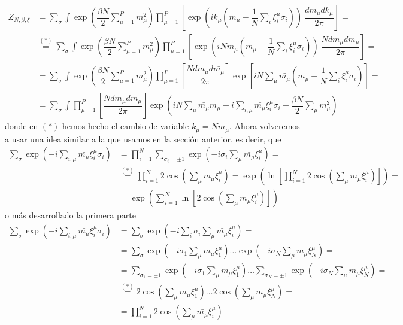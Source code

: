 \begin{align*}
    Z_{N,\beta,\xi}&=\sum_{\sigma}\int \exp\left(\dfrac{\beta N}{2} \sum_{\mu=1}^P m_\mu^2\right) \prod_{\mu=1}^{P} \left[\exp\left(ik_{\mu}\left(m_{\mu}-\dfrac{1}{N}\sum_{i} \xi_i^{\mu} \sigma_i\right)\right) \ \dfrac{dm_{\mu}dk_{\mu}}{2\pi}\right]=\\
    &\overset{(*)}{=}\sum_{\sigma}\int \exp\left(\dfrac{\beta N}{2} \sum_{\mu=1}^P m_\mu^2\right) \prod_{\mu=1}^{P} \left[\exp\left(iN\bar{m_{\mu}}\left(m_{\mu}-\dfrac{1}{N}\sum_{i} \xi_i^{\mu} \sigma_i\right)\right) \ \dfrac{Ndm_{\mu}d\bar{m_{\mu}}}{2\pi}\right]=\\
    &=\sum_{\sigma}\int \exp\left(\dfrac{\beta N}{2} \sum_{\mu=1}^P m_\mu^2\right) \prod_{\mu=1}^{P} \left[\dfrac{Ndm_{\mu}d\bar{m_{\mu}}}{2\pi}\right] \exp\left[iN \sum_{\mu}\bar{m_{\mu}}\left(m_{\mu}-\dfrac{1}{N}\sum_i \xi_i^{\mu}\sigma_i\right)\right]=\\
    &=\sum_{\sigma}\int \prod_{\mu=1}^{P} \left[\dfrac{Ndm_{\mu}d\bar{m_{\mu}}}{2\pi}\right] \exp\left(iN\sum_{\mu}\bar{m_{\mu}}m_{\mu}- i \sum_{i,\mu}\bar{m_{\mu}}\xi_i^{\mu}\sigma_i + \dfrac{\beta N}{2} \sum_{\mu} m_\mu^2 \right)
\end{align*}
donde en $(*)$ hemos hecho el cambio de variable $k_{\mu}=N\bar{m_{\mu}}$. Ahora volveremos a usar una idea similar a la que usamos en la sección anterior, es decir, que
\begin{align*}
    \sum_{\sigma} \exp\left(-i \sum_{i,\mu}\bar{m_{\mu}}\xi_i^{\mu}\sigma_i\right) &= \prod_{i=1}^{N} \sum_{\sigma_i = \pm 1} \exp\left(-i \sigma_i \sum_{\mu} \bar{m_{\mu}} \xi_i^{\mu}\right) = \\
    &\overset{(*)}{=}\prod_{i=1}^{N} 2\cos\left(\sum_{\mu} \bar{m_{\mu}} \xi_i^{\mu}\right) =\exp\left(\ln\left[ \prod_{i=1}^{N} 2\cos\left(\sum_{\mu} \bar{m_{\mu}} \xi_i^{\mu}\right) \right]\right) = \\
    &=\exp\left( \sum_{i=1}^N \ln \left[ 2 \cos\left( \sum_{\mu} \bar{m}_{\mu} \xi_i^{\mu} \right) \right] \right)
\end{align*}
o más desarrollado la primera parte
\begin{align*}
    \sum_{\sigma} \exp\left(-i \sum_{i,\mu}\bar{m_{\mu}}\xi_i^{\mu}\sigma_i\right) &= \sum_{\sigma} \exp\left(-i \sum_i \sigma_i \sum_{\mu} \bar{m_{\mu}} \xi_i^{\mu}\right)=\\
    &=\sum_{\sigma} \exp\left( -i\sigma_1 \sum_{\mu} \bar{m_{\mu}} \xi_1^{\mu} \right) \ldots \exp\left( -i\sigma_N \sum_{\mu} \bar{m_{\mu}} \xi_N^{\mu} \right)=\\
    &=\sum_{\sigma_1=\pm 1} \exp\left( -i\sigma_1 \sum_{\mu} \bar{m_{\mu}} \xi_1^{\mu} \right) \ldots \sum_{\sigma_N=\pm 1} \exp\left( -i\sigma_N \sum_{\mu} \bar{m_{\mu}} \xi_N^{\mu} \right)=\\
    &\overset{(*)}{=}2\cos\left( \sum_{\mu} \bar{m_{\mu}} \xi_1^{\mu} \right) \ldots  2\cos\left( \sum_{\mu} \bar{m_{\mu}} \xi_N^{\mu} \right)=\\
    &= \prod_{i=1}^{N} 2\cos\left(\sum_{\mu} \bar{m_{\mu}} \xi_i^{\mu}\right)
\end{align*}
